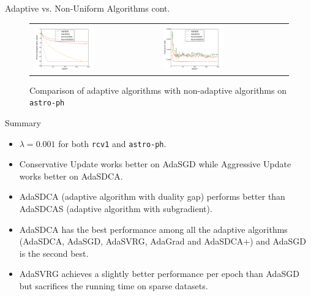\begin{frame}{Adaptive vs. Non-Uniform Algorithms cont.}
\begin{figure}[htbp]
\begin{tabular}{ll}
    \centering
        \includegraphics[width=0.5\textwidth]{images/comp_all_obej_astro.pdf} &
        \includegraphics[width=0.5\textwidth]{images/comp_all_terror_astro.pdf}
    \end{tabular}
    \caption{Comparison of adaptive algorithms with non-adaptive algorithms on \texttt{astro-ph}} 
    \label{fig:comp_all2}
\end{figure}
\end{frame}


\begin{frame}{Summary}
\begin{itemize}
	\item $\lambda=0.001$ for both \texttt{rcv1} and \texttt{astro-ph}.
	\item Conservative Update works better on AdaSGD  while Aggressive Update works better on AdaSDCA.
	\item AdaSDCA (adaptive algorithm with duality gap) performs better than AdaSDCAS (adaptive algorithm with subgradient).
	\item AdaSDCA has the best performance among all the adaptive algorithms (AdaSDCA, AdaSGD, AdaSVRG, AdaGrad and AdaSDCA+) and AdaSGD is the second best.
	\item AdaSVRG achieves a slightly better performance per epoch than AdaSGD but sacrifices the running time on sparse datasets.
\end{itemize}
\end{frame}

